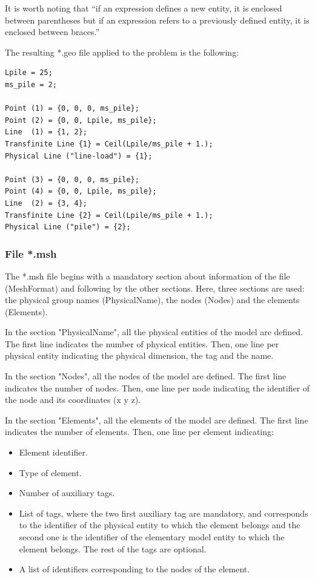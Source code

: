 \documentclass[a4]{article}
\begin{document}
It is worth noting that “if an expression defines a new entity, it is enclosed between parentheses but if an expression refers to a previously defined entity, it is enclosed between braces.” \cite{gmshweb}

The resulting *.geo file applied to the problem is the following:

\begin{Verbatim}
Lpile = 25;
ms_pile = 2;

Point (1) = {0, 0, 0, ms_pile};
Point (2) = {0, 0, Lpile, ms_pile};
Line  (1) = {1, 2};
Transfinite Line {1} = Ceil(Lpile/ms_pile + 1.);
Physical Line ("line-load") = {1};

Point (3) = {0, 0, 0, ms_pile};
Point (4) = {0, 0, Lpile, ms_pile};
Line  (2) = {3, 4};
Transfinite Line {2} = Ceil(Lpile/ms_pile + 1.);
Physical Line ("pile") = {2};
\end{Verbatim}

\subsubsection{File *.msh}

The *.msh file begins with a mandatory section about information of the file (MeshFormat) and following by the other sections. Here, three sections are used: the physical group names (PhysicalName), the nodes (Nodes) and the elements (Elements).

In the section "PhysicalName", all the physical entities of the model are defined. The first line indicates the number of physical entities. Then, one line per physical entity indicating the physical dimension, the tag and the name.  

In the section "Nodes", all the nodes of the model are defined. The first line indicates the number of nodes. Then, one line per node indicating the identifier of the node and its coordinates (x y z).

In the section "Elements", all the elements of the model are defined. The first line indicates the number of elements. Then, one line per element indicating:

\begin{itemize}
	\item Element identifier.
	\item Type of element.
	\item Number of auxiliary tags.
	\item List of tags, where the two first auxiliary tag are mandatory, and corresponds to the identifier of the physical entity to which the element belongs and the second one is the identifier of the elementary model entity to which the element belongs. The rest of the tags are optional.
	\item A list of identifiers corresponding to the nodes of the element.
\end{itemize}
\end{document}
